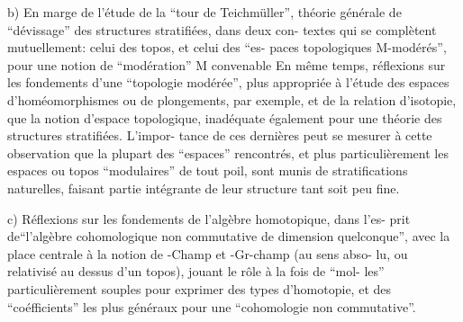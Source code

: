 b)  En marge de l'étude de la ``tour de Teichmüller'', 
théorie générale de ``dévissage'' des structures stratifiées, dans deux con-%
textes qui se complètent mutuellement:  celui des topos,  et celui des ``es-%
paces topologiques M-modérés'',  pour une notion de ``modération'' M convenable
En même temps, réflexions sur les fondements d'une ``topologie modérée'', plus
appropriée à l'étude des espaces d'homéomorphismes ou de plongements,  par
exemple,  et de la relation d'isotopie,  que la notion d'espace topologique,
inadéquate également pour une théorie des structures stratifiées. L'impor-%
tance de ces dernières peut se mesurer à cette observation\hand{,} que la plupart
des ``espaces'' rencontrés,  et plus particulièrement les espaces ou topos
``modulaires'' de tout poil,  sont munis de stratifications naturelles, faisant
partie intégrante de leur structure tant soit peu fine.

c)   Réflexions sur les fondements de l'algèbre homotopique,  dans l'es-%
prit de``l'algèbre cohomologique non commutative de dimension quelconque'',
avec la place centrale à la notion de \hand{$\infty$}-Champ et \hand{$\infty$}-Gr-champ (au sens abso-%
lu,  ou relativisé au dessus d'un topos),  jouant le rôle à la fois de ``mol-%
les'' particulièrement souples pour exprimer des types d'homotopie,  et des
``coéfficients'' les plus généraux pour une ``cohomologie non commutative''.

